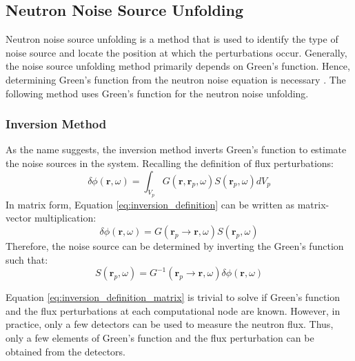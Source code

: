 \subsection{Neutron Noise Source Unfolding}

Neutron noise source unfolding is a method that is used to identify the type of noise source and locate the position at which the perturbations occur. Generally, the noise source unfolding method primarily depends on Green’s function. Hence, determining Green’s function from the neutron noise equation is necessary \cite{demaziereIdentificationLocalizationAbsorbers2005}. The following method uses Green’s function for the neutron noise unfolding.

\subsubsection{Inversion Method}

As the name suggests, the inversion method inverts Green’s function to estimate the noise sources in the system. Recalling the definition of flux perturbations:
\begin{equation}
    \delta \phi (\textbf{r},\omega) = \int_{V_p} G(\textbf{r}, \textbf{r}_p, \omega) S(\textbf{r}_p, \omega) dV_p
    \label{eq:inversion_definition}
\end{equation}
In matrix form, Equation \ref{eq:inversion_definition} can be written as matrix-vector multiplication:
\begin{equation}
    \delta \phi (\textbf{r},\omega) = G(\textbf{r}_p \rightarrow \textbf{r}, \omega) S(\textbf{r}_p, \omega)
    \label{eq:inversion_definition_matrix}
\end{equation}
Therefore, the noise source can be determined by inverting the Green’s function such that:
\begin{equation}
    S(\textbf{r}_p, \omega) = G^{-1}(\textbf{r}_p \rightarrow \textbf{r}, \omega) \delta \phi (\textbf{r},\omega) 
    \label{eq:source_inversion_matrix}
\end{equation}

Equation \ref{eq:inversion_definition_matrix} is trivial to solve if Green’s function and the flux perturbations at each computational node are known. However, in practice, only a few detectors can be used to measure the neutron flux. Thus, only a few elements of Green’s function and the flux perturbation can be obtained from the detectors. 

